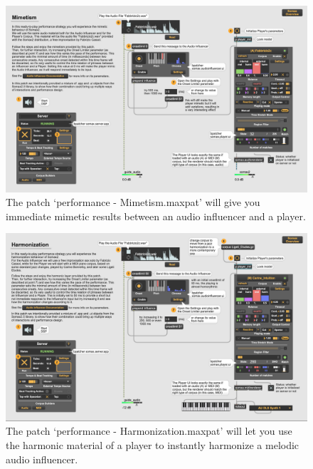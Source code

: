  \begin{figure}[H]
    \centering        
 	\includegraphics[width=1\textwidth]{img/mimetism.png}
    \caption{The patch `performance - Mimetism.maxpat' will give you immediate mimetic results between an audio influencer and a player.}
    \label{fig:mimetism}
\end{figure}

\begin{figure}[H]
    \centering        
 	\includegraphics[width=1\textwidth]{img/harmonization.png}
    \caption{The patch `performance - Harmonization.maxpat' will let you use the harmonic material of a player to instantly harmonize a melodic audio influencer.}
    \label{fig:harmonization}
\end{figure}


